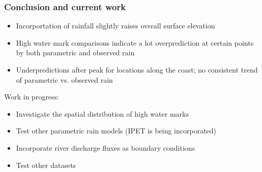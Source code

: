 \documentclass[10pt]{oden_beamer}
\begin{document}
\begin{frame}
  \frametitle{Conclusion and current work}
  \begin{itemize}
  \item Incorportation of rainfall slightly raises overall surface elevation
  \item High water mark comparisons indicate a lot overprediction at certain points by both parametric and observed rain
  \item Underpredictions after peak for locations along the coast; no consistent trend of parametric vs. observed rain
  \end{itemize}
  Work in progress:
  \begin{itemize}
  \item Investigate the spatial distribution of high water marks
  \item Test other parametric rain models (IPET is being incorporated)
  \item Incorporate river discharge fluxes as boundary conditions
  \item Test other datasets
  \end{itemize}
\end{frame}


\end{document}
